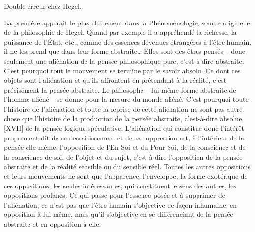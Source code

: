 \documentclass[french,twoside]{book} %
\begin{document}
Double erreur chez Hegel.\par
La première apparaît le plus clairement dans la Phénoménologie, source originelle de la philosophie de Hegel. Quand par exemple il a appréhendé la richesse, la puissance de l’État, etc., comme des essences devenues étrangères à l’être humain, il ne les prend que dans leur forme abstraite… Elles sont des êtres pensés – donc seulement une aliénation de la pensée philosophique pure, c’est-à-dire abstraite. C’est pourquoi tout le mouvement se termine par le savoir absolu. Ce dont ces objets sont l’aliénation et qu’ils affrontent en prétendant à la réalité, c’est précisément la pensée abstraite. Le philosophe – lui-même forme abstraite de l’homme aliéné – se donne pour la mesure du monde aliéné. C’est pourquoi toute l’histoire de l’aliénation et toute la reprise de cette aliénation ne sont pas autre chose que l’histoire de la production de la pensée abstraite, c’est-à-dire absolue, [XVII] de la pensée logique spéculative. L’aliénation qui constitue donc l’intérêt proprement dit de ce dessaisissement et de sa suppression est, à l’intérieur de la pensée elle-même, l’opposition de l’En Soi et du Pour Soi, de la conscience et de la conscience de soi, de l’objet et du sujet, c’est-à-dire l’opposition de la pensée abstraite et de la réalité sensible ou du sensible réel. Toutes les autres oppositions et leurs mouvements ne sont que l’apparence, l’enveloppe, la forme exotérique de ces oppositions, les seules intéressantes, qui constituent le sens des autres, les oppositions profanes. Ce qui passe pour l’essence posée et à supprimer de l’aliénation, ce n’est pas que l’être humain s’objective de façon inhumaine, en opposition à lui-même, mais qu’il s’objective en se différenciant de la pensée abstraite et en opposition à elle.\par
\end{document}
